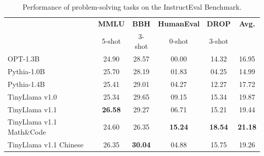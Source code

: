 \documentclass{article}
\begin{document}
\begin{table}[htbp!]
  \centering
  \scriptsize
  \caption{ Performance of problem-solving tasks on the InstructEval Benchmark.
  }
  \begin{tabular}{lccccc}
    \toprule
     & \textbf{MMLU}	&\textbf{BBH}&	\textbf{HumanEval}&	\textbf{DROP} & \textbf{Avg.} \\
     & 5-shot& 3-shot& 0-shot& 3-shot& \\
    \midrule
    OPT-1.3B\xspace      & 24.90 &	28.57 &	{\color{white} 0}0.00 &	14.32 & 16.95\\
    Pythia-1.0B\xspace      & 25.70 &	28.19 &	{\color{white} 0}1.83 &	{\color{white} 0}4.25 & 14.99\\
    Pythia-1.4B\xspace      & 25.41 &	29.01 &	{\color{white} 0}4.27  &	12.27 & 17.72 \\
    \midrule
        TinyLlama v1.0\xspace      & 25.34 &29.65 &	{\color{white} 0}9.15	& 15.34 & {19.87} \\
        TinyLlama v1.1\xspace      & \textbf{26.58} & 29.27 & {\color{white} 0}6.71 & 15.21 & 19.44 \\
        TinyLlama v1.1 Math\&Code \xspace      & 24.60 & 26.35 & \textbf{15.24} & \textbf{18.54} & \textbf{21.18} \\
        TinyLlama v1.1 Chinese \xspace      & 26.35 & \textbf{30.04} & {\color{white} 0}4.88 & 15.75 & 19.26 \\
    \bottomrule
  \end{tabular}
  \label{tab:pretrained_Instrust}
\end{table}
\vspace{-1em}
\end{document}

